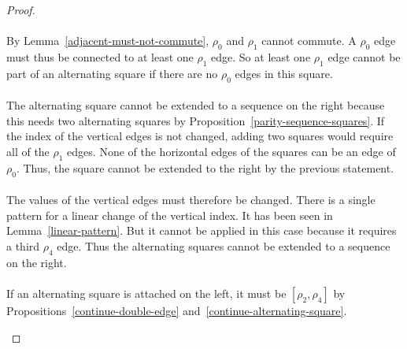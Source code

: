\begin{proof}
\paragraph{}
By Lemma~\ref{adjacent-must-not-commute}, $\rho_0$ and $\rho_1$ cannot commute. A $\rho_0$ edge must thus be connected to at least one $\rho_1$ edge. So at least one $\rho_1$ edge cannot be part of an alternating square if there are no $\rho_0$ edges in this square.

\paragraph{}
The alternating square cannot be extended to a sequence on the right because this needs two alternating squares by Proposition~\ref{parity-sequence-squares}.  If the index of the vertical edges is not changed, adding two squares would require all of the $\rho_1$ edges. None of the horizontal edges of the squares can be an edge of $\rho_0$. Thus, the square cannot be extended to the right by the previous statement.

\paragraph{}
The values of the vertical edges must therefore be changed. There is a single pattern for a linear change of the vertical index. It has been seen in Lemma~\ref{linear-pattern}. But it cannot be applied in this case because it requires a third $\rho_4$ edge. Thus the alternating squares cannot be extended to a sequence on the right.

\paragraph{}
If an alternating square is attached on the left, it must be $[\rho_2, \rho_4]$ by Propositions~\ref{continue-double-edge} and~\ref{continue-alternating-square}.

\begin{figure}[H]
  \begin{center}
\end{center}
\end{figure}
\end{proof}
